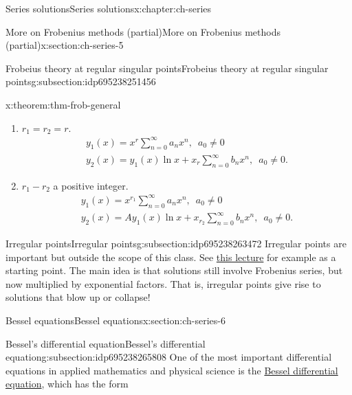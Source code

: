 \documentclass[oneside,10pt,]{book}
\numberwithin{equation}{section}
\numberwithin{equation}{section}
\begin{document}
\begin{chapterptx}{Series solutions}{}{Series solutions}{}{}{x:chapter:ch-series}
\begin{sectionptx}{More on Frobenius methods (partial)}{}{More on Frobenius methods (partial)}{}{}{x:section:ch-series-5}
\begin{subsectionptx}{Frobeius theory at regular singular points}{}{Frobeius theory at regular singular points}{}{}{g:subsection:idp695238251456}
\begin{theorem}{}{}{x:theorem:thm-frob-general}
\begin{enumerate}
%
\item{}\(r_1 = r_2 = r\).%
\begin{gather*}
y_1(x) = x^{r} \sum_{n=0}^\infty a_n x^n, \,\,\, a_0 \neq 0\\
y_2(x) = y_1(x) \ln x + x_{r} \sum_{n=0}^\infty b_n x^n, \,\,\, a_0 \neq 0.
\end{gather*}
%
\item{}\(r_1 - r_2\) a positive integer.%
\begin{gather*}
y_1(x) = x^{r_1} \sum_{n=0}^\infty a_n x^n, \,\,\, a_0 \neq 0\\
y_2(x) = Ay_1(x) \ln x + x_{r_2} \sum_{n=0}^\infty b_n x^n, \,\,\, a_0 \neq 0.
\end{gather*}
%
\end{enumerate}
%
\end{theorem}
\end{subsectionptx}
%
%
\typeout{************************************************}
\typeout{************************************************}
%
\begin{subsectionptx}{Irregular points}{}{Irregular points}{}{}{g:subsection:idp695238263472}
Irregular points are important but outside the scope of this class. See \href{https://ocw.mit.edu/courses/mathematics/18-305-advanced-analytic-methods-in-science-and-engineering-fall-2004/lecture-notes/eight1.pdf}{this lecture} for example as a starting point. The main idea is that solutions still involve Frobenius series, but now multiplied by exponential factors. That is, irregular points give rise to solutions that blow up or collapse!%
\end{subsectionptx}
\end{sectionptx}
%
%
\typeout{************************************************}
\typeout{************************************************}
%
\begin{sectionptx}{Bessel equations}{}{Bessel equations}{}{}{x:section:ch-series-6}
%
%
\typeout{************************************************}
\typeout{************************************************}
%
\begin{subsectionptx}{Bessel's differential equation}{}{Bessel's differential equation}{}{}{g:subsection:idp695238265808}
One of the most important differential equations in applied mathematics and physical science is the \href{https://en.wikipedia.org/wiki/Bessel_function}{Bessel differential equation}, which has the form%

\end{subsectionptx}
\end{sectionptx}
\end{chapterptx}
\end{document}
